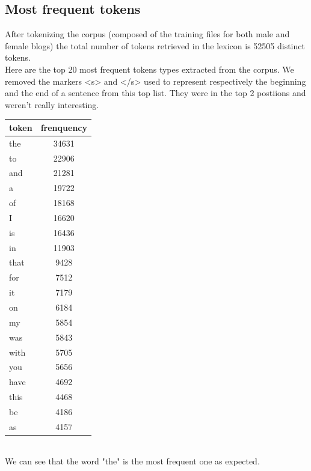 \documentclass{eplDoc}
\begin{document}
\subsection{Most frequent tokens}
After tokenizing the corpus (composed of the training files for both male and female blogs) the total number of tokens retrieved in the lexicon is  52505  distinct tokens.  \\ 
Here are the top 20 most frequent tokens types extracted from the corpus. We removed the markers <s> and </s> used to represent respectively the beginning and the end of a sentence from this top list. They were in the top 2 postiions and weren't really interesting. \\ 
\begin{center}
		\begin{tabular}{|l|c|}
			\hline
			token & frenquency \\
			\hline
			the  &  34631 \\ 
			to  &  22906 \\ 
			and  &  21281 \\ 
			a  &  19722 \\ 
			of  &  18168 \\ 
			I  &  16620 \\ 
			is  &  16436 \\ 
			in  &  11903 \\ 
			that  &  9428 \\ 
			for  &  7512 \\ 
			it  &  7179 \\ 
			on  &  6184 \\ 
			my  &  5854 \\ 
			was  &  5843 \\ 
			with  &  5705 \\ 
			you  &  5656 \\ 
			have  &  4692 \\ 
			this  &  4468 \\ 
			be  &  4186 \\ 
			as  &  4157 \\ 
			\hline
		\end{tabular}
\end{center}
 \ \\ 
We can see that the word "the" is the most frequent one as expected. 
\end{document}
